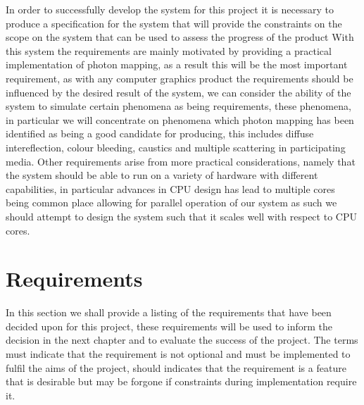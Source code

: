 \label{chap:reqs}
In order to successfully develop the system for this project it is necessary to produce a specification for the system
that will provide the constraints on the scope on the system that can be used to assess the progress of the product
With this system the requirements are mainly motivated by providing a practical implementation of photon mapping, as a result
this will be the most important requirement, as with any computer graphics product the requirements should be influenced by the
desired result of the system, we can consider the ability of the system to simulate certain phenomena as being requirements,
these phenomena, in particular we will concentrate on phenomena which photon mapping has been identified as being a good candidate
for producing, this includes diffuse intereflection, colour bleeding, caustics and multiple scattering in participating media.
Other requirements arise from more practical considerations, namely that the system should be able to run on a variety of
hardware with different capabilities, in particular advances in CPU design has lead to multiple cores being common place allowing
for parallel operation of our system as such we should attempt to design the system such that it scales well with respect
to CPU cores.

\section{Requirements}
In this section we shall provide a listing of the requirements that have been decided upon for this project, these
requirements will be used to inform the decision in the next chapter and to evaluate the success of the project.
The terms must indicate that the requirement is not optional and must be implemented to fulfil the aims of the project,
should indicates that the requirement is a feature that is desirable but may be forgone if constraints during implementation
require it.



